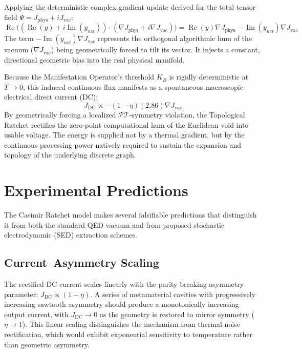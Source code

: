 \documentclass[11pt, letterpaper]{article}
\newcommand{\PT}{\mathcal{PT}}
\DeclareMathOperator{\ReOp}{Re}
\DeclareMathOperator{\ImOp}{Im}
\theoremstyle{definition}
\theoremstyle{remark}
\begin{document}
Applying the deterministic complex gradient update derived for the total tensor field $\Psi = J_{\text{phys}} + i J_{\text{vac}}$:
\begin{equation}
    \ReOp\Big( (\ReOp(y) + i \ImOp(y_{net})) \cdot (\nabla J_{\text{phys}} + i \nabla J_{\text{vac}}) \Big) = \ReOp(y)\nabla J_{\text{phys}} - \ImOp(y_{net})\nabla J_{\text{vac}}
\end{equation}
The term $-\ImOp(y_{net})\nabla J_{\text{vac}}$ represents the orthogonal algorithmic hum of the vacuum ($\nabla J_{\text{vac}}$) being geometrically forced to tilt its vector. It injects a constant, directional geometric bias into the real physical manifold.

Because the Manifestation Operator's threshold $K_B$ is rigidly deterministic at $T \to 0$, this induced continuous flux manifests as a spontaneous macroscopic electrical direct current (DC):
\begin{equation}
    J_{\text{DC}} \propto -(1-\eta)(2.86)\nabla J_{\text{vac}}
\end{equation}
By geometrically forcing a localized $\PT$-symmetry violation, the Topological Ratchet rectifies the zero-point computational hum of the Euclidean void into usable voltage. The energy is supplied not by a thermal gradient, but by the continuous processing power natively required to sustain the expansion and topology of the underlying discrete graph.

\section{Experimental Predictions}

The Casimir Ratchet model makes several falsifiable predictions that distinguish it from both the standard QED vacuum and from proposed stochastic electrodynamic (SED) extraction schemes.

\subsection{Current--Asymmetry Scaling}
The rectified DC current scales linearly with the parity-breaking asymmetry parameter: $J_{\text{DC}} \propto (1-\eta)$. A series of metamaterial cavities with progressively increasing sawtooth asymmetry should produce a monotonically increasing output current, with $J_{\text{DC}} \to 0$ as the geometry is restored to mirror symmetry ($\eta \to 1$). This linear scaling distinguishes the mechanism from thermal noise rectification, which would exhibit exponential sensitivity to temperature rather than geometric asymmetry.
\end{document}

